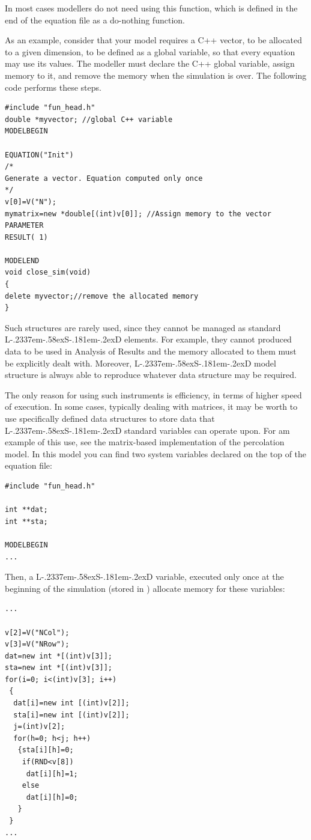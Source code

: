 \documentclass [11pt,a4paper] {book}
\def\LsD{{L\kern-.2337em\lower-.58ex\hbox{S}\kern-.181em\lower-.2ex\hbox{D}}\xspace}
\begin{document}
In most cases modellers do not need using this function, which is defined in the end of
the equation file as a do-nothing function. 

As an example, consider that your model requires a C++ vector, to be allocated to a given dimension, to be defined as a global variable, so that every equation may use its values. The modeller must declare the C++ global variable, assign memory to it, and remove the memory when the simulation is over. The following code performs these steps.

 \small
\begin{verbatim}
#include "fun_head.h"
double *myvector; //global C++ variable
MODELBEGIN

EQUATION("Init")
/*
Generate a vector. Equation computed only once
*/
v[0]=V("N");
mymatrix=new *double[(int)v[0]]; //Assign memory to the vector
PARAMETER
RESULT( 1)

MODELEND
void close_sim(void)
{
delete myvector;//remove the allocated memory
}

\end{verbatim}
\normalsize

Such structures are rarely used, since they cannot be managed as standard \LsD elements. For example, they cannot produced data to be used in Analysis of Results and the memory allocated to them must be explicitly dealt with. Moreover, \LsD model structure is always able to reproduce whatever data structure may be required. 

The only reason for using such instruments is efficiency, in terms of higher speed of execution. In some cases, typically dealing with matrices, it may be worth to use specifically defined data structures to store data that \LsD standard variables can operate upon. For am example of this use, see the matrix-based implementation of the percolation model. In this model you can find two system variables declared on the top of the equation file:

 \small
\begin{verbatim}
#include "fun_head.h"

int **dat;
int **sta;

MODELBEGIN
...
\end{verbatim}
\normalsize

Then, a \LsD variable, executed only once at the beginning of the simulation (stored in ) allocate memory for these variables:

 \small
\begin{verbatim}
...

v[2]=V("NCol");
v[3]=V("NRow");
dat=new int *[(int)v[3]];
sta=new int *[(int)v[3]];
for(i=0; i<(int)v[3]; i++)
 {
  dat[i]=new int [(int)v[2]];
  sta[i]=new int [(int)v[2]];
  j=(int)v[2];
  for(h=0; h<j; h++)
   {sta[i][h]=0;
    if(RND<v[8])
     dat[i][h]=1;
    else
     dat[i][h]=0; 
   }
 }  
...
\end{verbatim}
\normalsize
\end{document}
